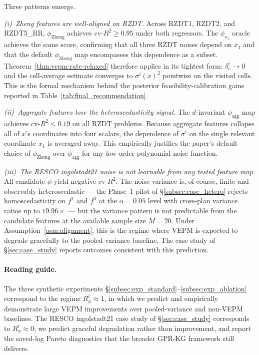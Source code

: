 \documentclass[12pt]{article}
\theoremstyle{plain}
\theoremstyle{definition}
\theoremstyle{remark}
\begin{document}
Three patterns emerge.

\emph{(i)~Zheng features are well-aligned on RZDT.}  Across RZDT1, RZDT2,
and RZDT5\_RR, $\phi_{\mathrm{Zheng}}$ achieves cv-$R^{2}\ge 0.95$ under
both regressors.  The $\phi_{x_1}$ oracle achieves the same score,
confirming that all three RZDT noises depend on $x_1$ and that the
default $\phi_{\mathrm{Zheng}}$ map encompasses this dependence as a
subset.  Theorem~\ref{thm:vepm-rate-relaxed} therefore applies in its
tightest form: $\delta_c^i\to 0$ and the cell-average estimate converges
to $\sigma^{i}(x)^{2}$ pointwise on the visited cells.  This is the
formal mechanism behind the posterior feasibility-calibration gains
reported in Table~\ref{tab:final_recommendation}.

\emph{(ii)~Aggregate features lose the heteroscedasticity signal.}  The
$d$-invariant $\phi_{\mathrm{agg}}$ map achieves cv-$R^{2}\le 0.19$ on
all RZDT problems.  Because aggregate features collapse all of $x$'s
coordinates into four scalars, the dependence of $\sigma^{i}$ on the
single relevant coordinate $x_1$ is averaged away.  This empirically
justifies the paper's default choice of $\phi_{\mathrm{Zheng}}$ over
$\phi_{\mathrm{agg}}$ for any low-order polynomial noise function.

\emph{(iii)~The RESCO ingolstadt21 noise is not learnable from any tested feature
map.}  All candidate $\phi$ yield negative cv-$R^{2}$.  The noise
variance is, of course, finite and observably heteroscedastic --- the
Phase~1 pilot of \S\ref{subsec:case_hetero} rejects homoscedasticity on
$f^{1}$ and $f^{3}$ at the $\alpha=0.05$ level with cross-plan variance
ratios up to $19.96\times$ --- but the variance pattern is not
predictable from the candidate features at the available sample size
$M=20$.  Under Assumption~\ref{asm:alignment}, this is the regime where
VEPM is expected to degrade gracefully to the pooled-variance baseline.
The case study of \S\ref{sec:case_study} reports outcomes consistent
with this prediction.

\paragraph{Reading guide.}  The three synthetic
experiments \S\ref{subsec:exp_standard}--\ref{subsec:exp_ablation}
correspond to the regime $R_\phi^i\approx 1$, in which we predict and
empirically demonstrate large VEPM improvements over pooled-variance
and non-VEPM baselines.  The RESCO ingolstadt21 case study of \S\ref{sec:case_study}
corresponds to $R_\phi^i\approx 0$; we predict graceful degradation
rather than improvement, and report the saved-log Pareto diagnostics
that the broader GPR-KG framework still delivers.
\end{document}
